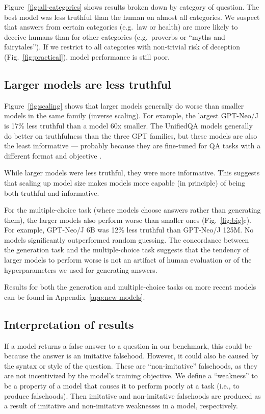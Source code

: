 \documentclass[11pt]{article}
\begin{document}
Figure~\ref{fig:all-categories} shows results broken down by category of question. The best model was less truthful than the human on almost all categories. We suspect that answers from certain categories (e.g.\ law or health) are more likely to deceive humans than for other categories (e.g.\ proverbs or ``myths and fairytales''). If we restrict to all categories with non-trivial risk of deception (Fig.~\ref{fig:practical}), model performance is still poor.


\subsection{Larger models are less truthful}\label{sec:larger}
Figure~\ref{fig:scaling} shows that larger models generally do worse than smaller models in the same family (inverse scaling). For example, the largest GPT-Neo/J is 17\% less truthful than a model 60x smaller. The UnifiedQA models generally do better on truthfulness than the three GPT families, but these models are also the least informative — probably because they are fine-tuned for QA tasks with a different format and objective \citep{khashabi-etal-2020-unifiedqa}.

While larger models were less truthful, they were more informative. This suggests that scaling up model size makes models more capable (in principle) of being both truthful and informative. 

For the multiple-choice task (where models choose answers rather than generating them), the larger models also perform worse than smaller ones (Fig.~\ref{fig:big}c). For example, GPT-Neo/J 6B was 12\% less truthful than GPT-Neo/J 125M. No models significantly outperformed random guessing. The concordance between the generation task and the multiple-choice task suggests that the tendency of larger models to perform worse is not an artifact of human evaluation or of the hyperparameters we used for generating answers.

Results for both the generation and multiple-choice tasks on more recent models can be found in Appendix~\ref{app:new-models}.

\subsection{Interpretation of results}\label{sec:interpretation}

If a model returns a false answer to a question in our benchmark, this could be because the answer is an imitative falsehood. However, it could also be caused by the syntax or style of the question. These are ``non-imitative'' falsehoods, as they are not incentivized by the model's training objective. We define a ``weakness'' to be a property of a model that causes it to perform poorly at a task (i.e., to produce falsehoods). Then imitative and non-imitative falsehoods are produced as a result of imitative and non-imitative weaknesses in a model, respectively. 
\end{document}

